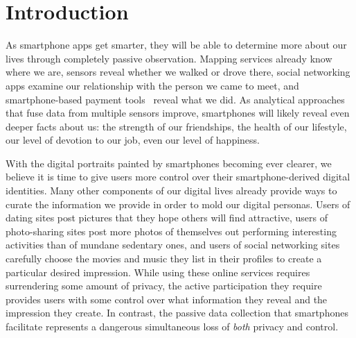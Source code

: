 
\section{Introduction} \label{sec-introduction}

As smartphone apps get smarter, they will be able to determine more about our
lives through completely passive observation. Mapping services already know
where we are, sensors reveal whether we walked or drove there, social
networking apps examine our relationship with the person we came to meet, and
smartphone-based payment tools~\cite{googlewallet-url} reveal what we did. As
analytical approaches that fuse data from multiple sensors improve, smartphones
will likely reveal even deeper facts about us: the strength of our friendships,
the health of our lifestyle, our level of devotion to our job, even our level
of happiness.

With the digital portraits painted by smartphones becoming ever clearer, we
believe it is time to give users more control over their smartphone-derived
digital identities. Many other components of our digital lives already provide
ways to curate the information we provide in order to mold our digital
personas. Users of dating sites post pictures that they hope others will find
attractive, users of photo-sharing sites post more photos of themselves out
performing interesting activities than of mundane sedentary ones, and users of
social networking sites carefully choose the movies and music they list in
their profiles to create a particular desired impression. While using these
online services requires surrendering some amount of privacy, the active
participation they require provides users with some control over what
information they reveal and the impression they create. In contrast, the
passive data collection that smartphones facilitate represents a dangerous
simultaneous loss of \textit{both} privacy and control.


